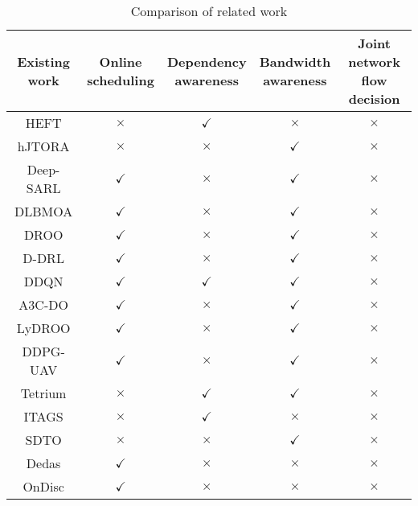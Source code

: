 \documentclass[10pt, conference, letterpaper]{IEEEtran}
\begin{document}
\begin{table}[t]
\centering
\caption{Comparison of related work}\label{table1}
\begin{tabular}{@{}c@{}cccc@{}}
    \toprule
    \makecell[c]{Existing\\work} & \makecell[c]{Online\\scheduling} &  \makecell[c]{Dependency\\awareness} &  \makecell[c]{Bandwidth\\awareness} &  \makecell[c]{Joint network\\flow decision} \\
    \midrule
    HEFT \cite{topcuoglu2002performance} & $\times$ & $\checkmark$ & $\times$ & $\times$ \\
    hJTORA \cite{tran2018joint} & $\times$ & $\times$ & $\checkmark$ & $\times$ \\
    Deep-SARL \cite{chen2018optimized} & $\checkmark$ & $\times$ & $\checkmark$ & $\times$ \\
    DLBMOA \cite{dinh2018learning} & $\checkmark$ & $\times$ & $\checkmark$ & $\times$ \\
    DROO \cite{huang2019deep}& $\checkmark$ & $\times$ & $\checkmark$ & $\times$ \\
    D-DRL \cite{zhan2020deep} & $\checkmark$ & $\times$ & $\checkmark$ & $\times$ \\
    DDQN \cite{tang2020deep} & $\checkmark$ & $\checkmark$ & $\checkmark$ & $\times$ \\
    A3C-DO \cite{zou2020a3c} & $\checkmark$ & $\times$ & $\checkmark$ & $\times$ \\
    LyDROO \cite{bi2021lyapunov} & $\checkmark$ & $\times$ & $\checkmark$ & $\times$ \\
    DDPG-UAV \cite{wang2021computation} & $\checkmark$ & $\times$ & $\checkmark$ & $\times$ \\
    Tetrium \cite{hung2018wide} & $\times$ & $\checkmark$ & $\checkmark$ & $\times$ \\
    ITAGS \cite{sundar2018offloading} &$\times$&$\checkmark$&$\times$&$\times$ \\
    SDTO \cite{chen2018task} &$\times$&$\times$&$\checkmark$&$\times$ \\
    Dedas \cite{meng2019dedas} & $\checkmark$&$\times$&$\times$&$\times$\\
    OnDisc \cite{han2019ondisc} &$\checkmark$&$\times$&$\times$&$\times$ \\

\end{tabular}
\end{table}
\end{document}
